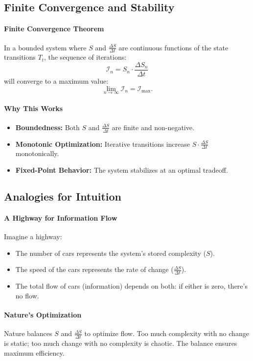 \documentclass[12pt]{article}
\begin{document}
\subsection{Finite Convergence and Stability}

\paragraph{Finite Convergence Theorem}
In a bounded system where \(S\) and \(\frac{\Delta S}{\Delta t}\) are continuous functions of the state transitions \(T_t\), the sequence of iterations:
\[
\mathcal{I}_n = S_n \cdot \frac{\Delta S_n}{\Delta t}
\]
will converge to a maximum value:
\[
\lim_{n \to \infty} \mathcal{I}_n = \mathcal{I}_{\text{max}}.
\]

\paragraph{Why This Works}
\begin{itemize}
    \item \textbf{Boundedness:} Both \(S\) and \(\frac{\Delta S}{\Delta t}\) are finite and non-negative.
    \item \textbf{Monotonic Optimization:} Iterative transitions increase \(S \cdot \frac{\Delta S}{\Delta t}\) monotonically.
    \item \textbf{Fixed-Point Behavior:} The system stabilizes at an optimal tradeoff.
\end{itemize}

\subsection{Analogies for Intuition}

\paragraph{A Highway for Information Flow}
Imagine a highway:
\begin{itemize}
    \item The number of cars represents the system’s stored complexity (\(S\)).
    \item The speed of the cars represents the rate of change (\(\frac{\Delta S}{\Delta t}\)).
    \item The total flow of cars (information) depends on both: if either is zero, there’s no flow.
\end{itemize}

\paragraph{Nature’s Optimization}
Nature balances \(S\) and \(\frac{\Delta S}{\Delta t}\) to optimize flow. Too much complexity with no change is static; too much change with no complexity is chaotic. The balance ensures maximum efficiency.
\end{document}
